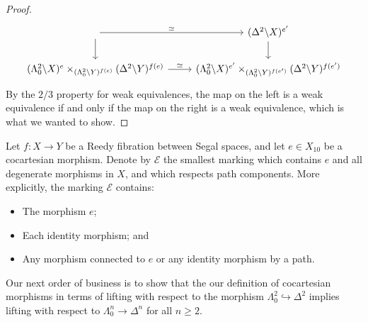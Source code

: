 \documentclass[main.tex]{subfiles}
\begin{document}
\begin{proof}
\begin{equation*}
\begin{tikzcd}
      \arrow[r, "\simeq"]
      \arrow[d]
      & (\Delta^{2} \backslash X)^{e'}
      \arrow[d]
      \\
      (\Lambda^{2}_{0} \backslash X)^{e} \times_{(\Lambda^{2}_{0} \backslash Y)^{f(e)}} (\Delta^{2} \backslash Y)^{f(e)}
      \arrow[r, "\simeq"]
      & (\Lambda^{2}_{0} \backslash X)^{e'} \times_{(\Lambda^{2}_{0} \backslash Y)^{f(e')}} (\Delta^{2} \backslash Y)^{f(e')}
    \end{tikzcd}
  \end{equation*}
  By the $2/3$ property for weak equivalences, the map on the left is a weak equivalence if and only if the map on the right is a weak equivalence, which is what we wanted to show.
\end{proof}

\begin{definition}
  \label{def:morphism_generated_marking}
  Let $f\colon X \to Y$ be a Reedy fibration between Segal spaces, and let $e \in X_{10}$ be a cocartesian morphism. Denote by $\mathcal{E}$ the smallest marking which contains $e$ and all degenerate morphisms in $X$, and which respects path components. More explicitly, the marking $\mathcal{E}$ contains:
  \begin{itemize}
    \item The morphism $e$;

    \item Each identity morphism; and

    \item Any morphism connected to $e$ or any identity morphism by a path.
  \end{itemize}
\end{definition}

Our next order of business is to show that the our definition of cocartesian morphisms in terms of lifting with respect to the morphism $\Lambda^{2}_{0} \hookrightarrow \Delta^{2}$ implies lifting with respect to $\Lambda^{n}_{0} \to \Delta^{n}$ for all $n \geq 2$.
\end{document}
